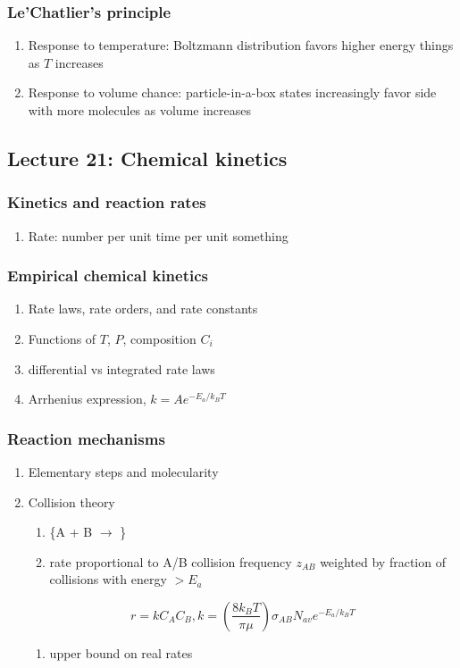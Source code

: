 \documentclass[11pt]{article}
\begin{document}
\subsubsection{Le'Chatlier's principle}
\label{sec:orgeceb2c0}
\begin{enumerate}
\item Response to temperature: Boltzmann distribution favors higher energy things as \(T\) increases
\item Response to volume chance: particle-in-a-box states increasingly favor side with more molecules as volume increases
\end{enumerate}

\subsection{Lecture 21: Chemical kinetics}
\label{sec:org2326feb}
\subsubsection{Kinetics and reaction rates}
\label{sec:orga2ba0b0}
\begin{enumerate}
\item Rate: number per unit time per unit something
\end{enumerate}

\subsubsection{Empirical chemical kinetics}
\label{sec:orge597104}
\begin{enumerate}
\item Rate laws, rate orders, and rate constants
\item Functions of \(T\), \(P\), composition \(C_i\)
\item differential vs integrated rate laws
\item Arrhenius expression, \(k=A e^{-E_a/k_BT}\)
\end{enumerate}
\subsubsection{Reaction mechanisms}
\label{sec:orgd0cdfd7}
\begin{enumerate}
\item Elementary steps and molecularity
\item Collision theory
\begin{enumerate}
\item \ce\{A + B \(\rightarrow\) \}
\item rate proportional to A/B collision frequency \(z_{AB}\) weighted by fraction of collisions with energy \(> E_a\)
\end{enumerate}
\begin{displaymath}
   r = k C_A C_B , k = \left ( \frac{8 k_B T}{\pi \mu} \right ) \sigma_{AB} N_{av} e^{-E_a/k_BT}
\end{displaymath}
\begin{enumerate}
\item upper bound on real rates
\end{enumerate}
\end{enumerate}
\end{document}
